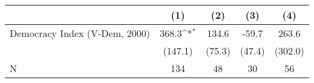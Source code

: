 {
\def\sym#1{\ifmmode^{#1}\else\(^{#1}\)\fi}
\begin{tabular}{l*{4}{c}}
\hline\hline
                    &\multicolumn{1}{c}{(1)}         &\multicolumn{1}{c}{(2)}         &\multicolumn{1}{c}{(3)}         &\multicolumn{1}{c}{(4)}         \\
\hline
Democracy Index (V-Dem, 2000)&       368.3\sym{*}  &       134.6         &       -59.7         &       263.6         \\
                    &     (147.1)         &      (75.3)         &      (47.4)         &     (302.0)         \\
\hline
N                   &         134         &          48         &          30         &          56         \\
\hline\hline
\end{tabular}
}
